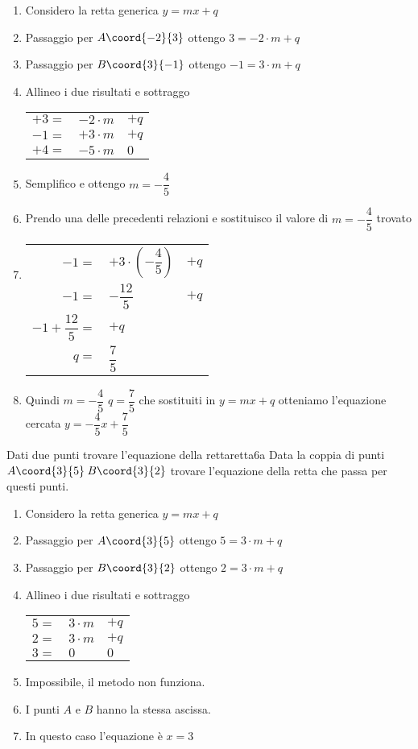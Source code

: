 \begin{enumerate}
	\item Considero la retta generica $y=mx+q$
	\item Passaggio per $A\coord{-2}{3}$ ottengo $3=-2\cdot m+q$
	\item Passaggio per $B\coord{3}{-1}$ ottengo $-1=3\cdot m+q$
	\item Allineo i due risultati e sottraggo
	\begin{tabular}{rll}
		$+3=$&$-2\cdot m$ &$+q$  \\ 
		$-1=$&$+3\cdot m$ &$+q$  \\ 
		\hline $+4=$&$-5\cdot m$& $0$ \\ 
	\end{tabular} 
	\item Semplifico e ottengo $m=-\dfrac{4}{5}$
	\item Prendo una delle precedenti relazioni e sostituisco il valore di $m=-\dfrac{4}{5}$ trovato
	\item \begin{tabular}{rll}
		$-1=$&$+3\cdot(-\dfrac{4}{5}) $ &$+q$  \\ 
		$-1=$&$-\dfrac{12}{5}$ &$+q$  \\ 
		$-1+\dfrac{12}{5}=$& $+q$  \\ 
		$q=$&$\dfrac{7}{5}$ 
	\end{tabular} 
	\item Quindi $m=-\dfrac{4}{5}$ $q=\dfrac{7}{5}$ che sostituiti in $y=mx+q$ otteniamo l'equazione cercata $y=-\dfrac{4}{5}x+\dfrac{7}{5}$
\end{enumerate}
\begin{cesempiot}{Dati due punti trovare l'equazione della retta}{retta6a}
	Data la coppia di punti	$A\coord{3}{5}$\,$B\coord{3}{2}$ trovare l'equazione della retta che passa per questi punti.
\end{cesempiot}
\begin{enumerate}
	\item Considero la retta generica $y=mx+q$
	\item Passaggio per $A\coord{3}{5}$ ottengo $5=3\cdot m+q$
	\item Passaggio per $B\coord{3}{2}$ ottengo $2=3\cdot m+q$
	\item Allineo i due risultati e sottraggo
	\begin{tabular}{rll}
		$5=$&$3\cdot m$ &$+q$  \\ 
		$2=$&$3\cdot m$ &$+q$  \\ 
		\midrule $3=$&$0$& $0$ \\ 
	\end{tabular} 
	\item Impossibile, il metodo non funziona.
	\item I punti $A$ e $B$ hanno la stessa ascissa.
	\item In questo caso l'equazione è $x=3$
\end{enumerate}
